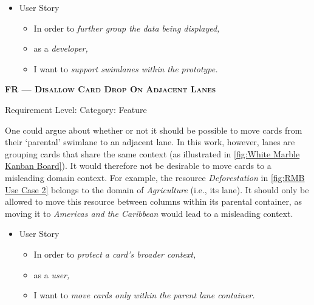 \begin{itemize}[after=\vspace{1em}]
    \setlength\itemsep{-0.5em}
	\item[] User Story\\[-7.8mm]
	\begin{itemize}
    \setlength\itemsep{-0.5em}
        \item[] In order to \textit{further group the data being displayed,}
        \item[] as a \textit{developer,}
        \item[] I want to \textit{support swimlanes within the prototype.}
    \end{itemize}
\end{itemize}


\centerline{\textbf{FR\textsubscript{} --- \textsc{Disallow Card Drop On Adjacent Lanes}}}

\centerline{\small Requirement Level:  \quad{} Category: Feature}

\noindent One could argue about whether or not it should be possible to move cards from their ‘parental’ swimlane to an adjacent lane. In this work, however, lanes are grouping cards that share the same context (as illustrated in \autoref{fig:White Marble Kanban Board}). It would therefore not be desirable to move cards to a misleading domain context. For example, the resource \textit{Deforestation} in \autoref{fig:RMB Use Case 2} belongs to the domain of \textit{Agriculture} (i.e., its lane). It should only be allowed to move this resource between columns within its parental container, as moving it to \textit{Americas and the Caribbean} would lead to a misleading context.


\begin{itemize}[after=\vspace{1em}]
    \setlength\itemsep{-0.5em}
	\item[] User Story\\[-7.8mm]
	\begin{itemize}
    \setlength\itemsep{-0.5em}
        \item[] In order to \textit{protect a card’s broader context,}
        \item[] as a \textit{user,}
        \item[] I want to \textit{move cards only within the parent lane container.}
    \end{itemize}
\end{itemize}




